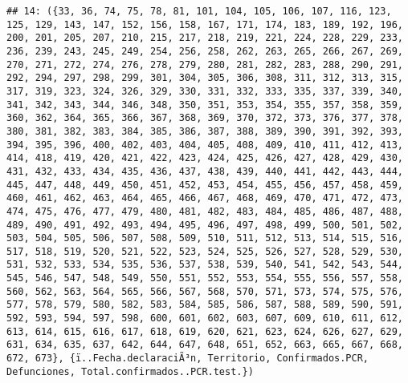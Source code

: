 \documentclass[
]{book}
\begin{document}
\begin{verbatim}
## 14: ({33, 36, 74, 75, 78, 81, 101, 104, 105, 106, 107, 116, 123, 125, 129, 143, 147, 152, 156, 158, 167, 171, 174, 183, 189, 192, 196, 200, 201, 205, 207, 210, 215, 217, 218, 219, 221, 224, 228, 229, 233, 236, 239, 243, 245, 249, 254, 256, 258, 262, 263, 265, 266, 267, 269, 270, 271, 272, 274, 276, 278, 279, 280, 281, 282, 283, 288, 290, 291, 292, 294, 297, 298, 299, 301, 304, 305, 306, 308, 311, 312, 313, 315, 317, 319, 323, 324, 326, 329, 330, 331, 332, 333, 335, 337, 339, 340, 341, 342, 343, 344, 346, 348, 350, 351, 353, 354, 355, 357, 358, 359, 360, 362, 364, 365, 366, 367, 368, 369, 370, 372, 373, 376, 377, 378, 380, 381, 382, 383, 384, 385, 386, 387, 388, 389, 390, 391, 392, 393, 394, 395, 396, 400, 402, 403, 404, 405, 408, 409, 410, 411, 412, 413, 414, 418, 419, 420, 421, 422, 423, 424, 425, 426, 427, 428, 429, 430, 431, 432, 433, 434, 435, 436, 437, 438, 439, 440, 441, 442, 443, 444, 445, 447, 448, 449, 450, 451, 452, 453, 454, 455, 456, 457, 458, 459, 460, 461, 462, 463, 464, 465, 466, 467, 468, 469, 470, 471, 472, 473, 474, 475, 476, 477, 479, 480, 481, 482, 483, 484, 485, 486, 487, 488, 489, 490, 491, 492, 493, 494, 495, 496, 497, 498, 499, 500, 501, 502, 503, 504, 505, 506, 507, 508, 509, 510, 511, 512, 513, 514, 515, 516, 517, 518, 519, 520, 521, 522, 523, 524, 525, 526, 527, 528, 529, 530, 531, 532, 533, 534, 535, 536, 537, 538, 539, 540, 541, 542, 543, 544, 545, 546, 547, 548, 549, 550, 551, 552, 553, 554, 555, 556, 557, 558, 560, 562, 563, 564, 565, 566, 567, 568, 570, 571, 573, 574, 575, 576, 577, 578, 579, 580, 582, 583, 584, 585, 586, 587, 588, 589, 590, 591, 592, 593, 594, 597, 598, 600, 601, 602, 603, 607, 609, 610, 611, 612, 613, 614, 615, 616, 617, 618, 619, 620, 621, 623, 624, 626, 627, 629, 631, 634, 635, 637, 642, 644, 647, 648, 651, 652, 663, 665, 667, 668, 672, 673}, {ï..Fecha.declaraciÃ³n, Territorio, Confirmados.PCR, Defunciones, Total.confirmados..PCR.test.})

\end{verbatim}
\end{document}
